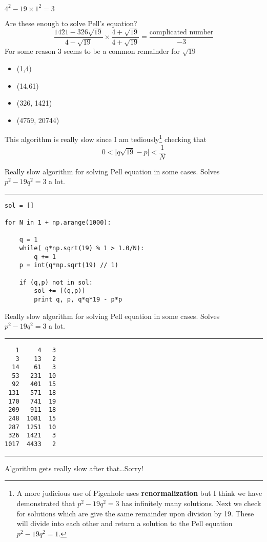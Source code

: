 \documentclass[12pt]{article}
\begin{document}
\noindent $ 4^2 - 19 \times 1^2 = 3$ \newline

\noindent Are these enough to solve Pell's equation?
$$ \frac{1421 - 326\sqrt{19}}{4 - \sqrt{19}}\times \frac{4 + \sqrt{19}}{4 + \sqrt{19}}
= \frac{\text{complicated number}}{-3} $$
For some reason $3$ seems to be a common remainder for $\sqrt{19}$
\begin{itemize}
\item (1,4)
\item (14,61)
\item (326, 1421)
\item (4759, 20744)
\end{itemize}
This algorithm is really slow since I am tediously\footnote{A more judicious use of Pigenhole uses \textbf{renormalization} but I think we have demonstrated that $p^2 - 19q^2 = 3 $ has infinitely many solutions.  Next we check for solutions which are give the same remainder upon division by 19.  These will divide into each other and return a solution to the Pell equation $p^2 - 19q^2 = 1$.} checking that
$$ 0< \big| q \sqrt{19} - p \big| < \frac{1}{N} $$

\newpage

\noindent Really slow algorithm for solving Pell equation in some cases.  Solves $p^2 - 19q^2 = 3$ a lot.
\vspace{6pt}
\hrule

\begin{verbatim}
sol = []

for N in 1 + np.arange(1000):

    q = 1
    while( q*np.sqrt(19) % 1 > 1.0/N):
        q += 1
    p = int(q*np.sqrt(19) // 1)
    
    if (q,p) not in sol:
        sol += [(q,p)]
        print q, p, q*q*19 - p*p
\end{verbatim}

\newpage

\noindent Really slow algorithm for solving Pell equation in some cases.  Solves $p^2 - 19q^2 = 3$ a lot.
\vspace{6pt}
\hrule

\begin{verbatim}
   1     4   3
   3    13   2
  14    61   3
  53   231  10
  92   401  15
 131   571  18
 170   741  19
 209   911  18
 248  1081  15
 287  1251  10
 326  1421   3
1017  4433   2
\end{verbatim}
\vspace{6pt}
\hrule
\vspace{6pt}
Algorithm gets really slow after that\dots Sorry!
\end{document}
